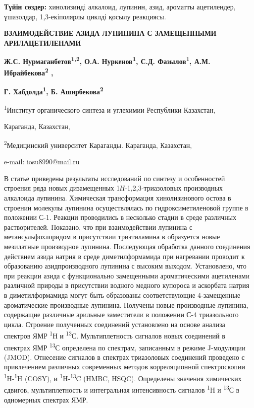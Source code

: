 {\bfseries Түйін сөздер:} хинолизинді алкалоид, лупинин, азид, ароматты
ацетилендер, үшазолдар, 1,3-екіполярлы циклді қосылу реакциясы.

\begin{center}
{\large\bfseries ВЗАИМОДЕЙСТВИЕ АЗИДА ЛУПИНИНА С ЗАМЕЩЕННЫМИ АРИЛАЦЕТИЛЕНАМИ}

{\bfseries Ж.С. Нурмаганбетов\textsuperscript{1,2}, О.А.
Нуркенов\textsuperscript{1}, С.Д. Фазылов\textsuperscript{1}\envelope, А.М.
Ибрайбекова\textsuperscript{2} ,}

{\bfseries Г. Хабдолда\textsuperscript{1}, Б.
Аширбекова\textsuperscript{2}}

\textsuperscript{1}Институт органического синтеза и углехимии Республики
Казахстан,

Караганда, Казахстан,

\textsuperscript{2}Медицинский университет Караганды. Караганда,
Казахстан,

e-mail: iosu8990@mail.ru
\end{center}

В статье приведены результаты исследований по синтезу и особенностей
строения ряда новых дизамещенных 1\emph{Н}-1,2,3-триазоловых производных
алкалоида лупинина. Химическая трансформация хинолизинового остова в
строении молекулы лупинина осуществлялась по гидроксиметиленовой группе
в положении С-1. Реакции проводились в несколько стадии в среде
различных растворителей. Показано, что при взаимодействии лупинина с
метансульфохлоридом в присутствии триэтиламина в образуется новые
мезилатные производное лупинина. Последующая обработка данного
соединения действием азида натрия в среде диметилформамида при
нагревании проводит к образованию азидпроизводного лупинина с высоким
выходом. Установлено, что при реакции азида с функционально замещенными
ароматическими ацетиленами различной природы в присутствии водного
медного купороса и аскорбата натрия в диметилформамида могут быть
образованы соответствующие 4-замещенные ароматические производные
лупинина. Получены новые производные лупинина, содержащие различные
арильные заместители в положении С-4 триазольного цикла. Строение
полученных соединений установлено на основе анализа спектров ЯМР
\textsuperscript{1}Н и \textsuperscript{13}С. Мультиплетность сигналов
новых соединений в спектрах ЯМР \textsuperscript{13}С определена по
спектрам, записанным в режиме J-модуляции (JMOD). Отнесение сигналов в
спектрах триазоловых соединений проведено с привлечением различных
современных методов корреляционной спектроскопии
\textsuperscript{1}H-\textsuperscript{1}H (COSY), и
\textsuperscript{1}H-\textsuperscript{13}C (HMBC, HSQC). Определены
значения химических сдвигов, мультиплетность и интегральная
интенсивность сигналов \textsuperscript{1}Н и \textsuperscript{13}С в
одномерных спектрах ЯМР.

